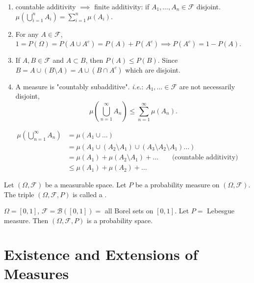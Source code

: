 \documentclass[class=article,crop=false]{standalone}
\begin{document}
\begin{note}
\begin{enumerate}
	\item countable additivity $\implies$ finite additivity: if $A_1,\ldots,A_n \in \mathcal{F}$ disjoint. $\mu\left( \bigcup_{i= 1}^{ n} A_i \right) = \sum_{ i=1}^{ n} \mu(A_i)$.
	\item For any $A\in \mathcal{F}$, $1=P(\Omega)=P(A \cup A^{c}) = P(A) + P(A^{c}) \implies P(A^{c})=1-P(A)$.
	\item If $A,B \in \mathcal{F}$ and $A \subset B$, then $P(A) \leq P(B)$. Since $B=A \cup (B \setminus A) = A \cup (B \cap A^{c})$ which are disjoint.
	\item A measure is "countably subadditive". \emph{i.e.}: $A_1,\ldots \in \mathcal{F}$ are not necessarily disjoint, 
		\[
			\mu\left( \bigcup_{n= 1}^{\infty} A_n  \right) \leq \sum_{ n=1}^{\infty} \mu(A_n)
		.\] 
\end{enumerate}
\end{note}

\begin{prf}
\begin{align*}
	\mu\left( \bigcup_{n= 1}^{\infty} A_n \right) &= \mu(A_1 \cup \ldots) \\
						      &= \mu(A_1 \cup (A_2 \setminus A_1) \cup (A_3 \setminus A_2 \setminus A_1) \ldots) \\
						      &= \mu(A_1) + \mu(A_2 \setminus A_1) + \ldots \qquad  \text{(countable additivity)}  \\
						      &\leq \mu(A_1) + \mu(A_2) + \ldots 
\end{align*}
\end{prf}


\begin{defn}
	Let $(\Omega,\mathcal{F})$ be a measurable space. Let $P$ be a probability measure on  $(\Omega,\mathcal{F})$. The triple $(\Omega,\mathcal{F},P)$ is called a .
\end{defn}


\begin{eg}[]
	$\Omega=[0,1]$, $\mathcal{F}=\mathcal{B}([0,1]) =$ all Borel sets on $[0,1]$. Let $P =$ Lebesgue measure. Then $(\Omega,\mathcal{F},P)$ is a probability space.  
\end{eg}

\section{Existence and Extensions of Measures}
\end{document}
